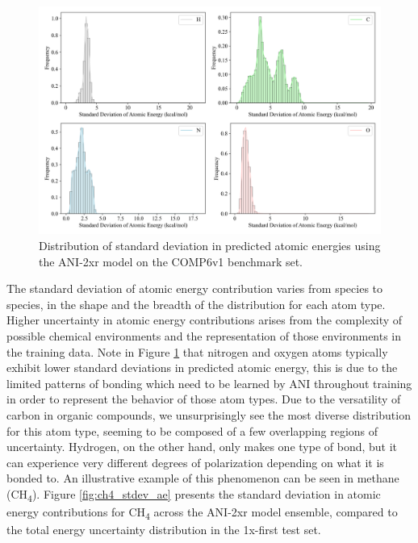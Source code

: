 \begin{figure}[H]
    \centering
    \includegraphics[width=1\linewidth]{Images/2xr_outputs/2xr_comp6v1_stdev-ae-per-atomtype.png}
    \caption[Standard deviation in predicted atomic energy contribution for H, C, N, O atom types]{Distribution of standard deviation in predicted atomic energies using the ANI-2xr model on the COMP6v1 benchmark set.}
    \label{fig:2xr_comp6v1_stdev-ae-per-atomtype}
\end{figure}

The standard deviation of atomic energy contribution varies from species to species, in the shape and the breadth of the distribution for each atom type.
Higher uncertainty in atomic energy contributions arises from the complexity of possible chemical environments and the representation of those environments in the training data.
Note in Figure \ref{fig:2xr_comp6v1_stdev-ae-per-atomtype} that nitrogen and oxygen atoms typically exhibit lower standard deviations in predicted atomic energy, this is due to the limited patterns of bonding which need to be learned by ANI throughout training in order to represent the behavior of those atom types.
Due to the versatility of carbon in organic compounds, we unsurprisingly see the most diverse distribution for this atom type, seeming to be composed of a few overlapping regions of uncertainty. 
Hydrogen, on the other hand, only makes one type of bond, but it can experience very different degrees of polarization depending on what it is bonded to. 
An illustrative example of this phenomenon can be seen in methane (CH\textsubscript{4}). 
Figure \ref{fig:ch4_stdev_ae} presents the standard deviation in atomic energy contributions for CH\textsubscript{4} across the ANI-2xr model ensemble, compared to the total energy uncertainty distribution in the 1x-first test set.

